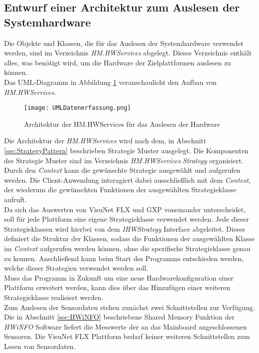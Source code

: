 \subsection{Entwurf einer Architektur zum Auslesen der Systemhardware}\label{sec:AuslesenHardware}
Die Objekte und Klassen, die für das Auslesen der Systemhardware verwendet werden, sind im Verzeichnis \textit{HM.HWServices} abgelegt. Dieses Verzeichnis enthält alles, was benötigt wird, um die Hardware der Zielplattformen auslesen zu können.\\
Das UML-Diagramm in Abbildung \ref{fig:HWServicesUML} veranschaulicht den Aufbau von \textit{HM.HWServices}. 
\begin{center}
    \begin{figure}[h!]
        \centering
        \texttt{[image: UMLDatenerfassung.png]}
        \caption{Architektur der HM.HWServices für das Auslesen der Hardware}
        \label{fig:HWServicesUML}
    \end{figure}
\end{center}
\vspace{-1.8cm}
Die Architektur der \textit{HM.HWServices} wird nach dem, in Abschnitt \ref{sec:StrategyPattern} beschrieben Strategie Muster ausgelegt.
Die Komponenten des Strategie Muster sind im Verzeichnis \textit{HM.HWServices.Strategy} organisiert.\\
Durch den \textit{Context} kann die gewünschte Strategie ausgewählt und aufgerufen werden. Die Client-Anwendung interagiert dabei ausschließlich mit dem \textit{Context}, der wiederum die gewünschten Funktionen der ausgewählten Strategieklasse aufruft.\\  
Da sich das Auswerten von VisuNet FLX und GXP voneinander unterscheidet, soll für jede Plattform eine eigene Strategieklasse verwendet werden. Jede dieser Strategieklassen wird hierbei von dem \textit{IHWStrategy} Interface abgeleitet. Dieses definiert die Struktur der Klassen, sodass die Funktionen der ausgewählten Klasse im \textit{Context} aufgerufen werden können, ohne die spezifische Strategieklasse genau zu kennen. Anschließend kann beim Start des Programms entschieden werden, welche dieser Strategien verwendet werden soll.\\
Muss das Programm in Zukunft um eine neue Hardwarekonfiguration einer Plattform erweitert werden, kann dies über das Hinzufügen einer weiteren Strategieklasse realisiert werden.\\
Zum Auslesen der Sensordaten stehen zunächst zwei Schnittstellen zur Verfügung. Die in Abschnitt \ref{sec:HWiNFO} beschriebene Shared Memory Funktion der \textit{HWiNFO} Software liefert die Messwerte der an das Mainboard angeschlossenen Sensoren. Die VisuNet FLX Plattform bedarf keiner weiteren Schnittstellen zum Lesen von Sensordaten.\\
